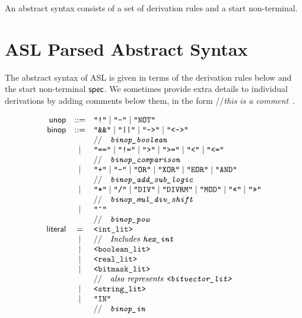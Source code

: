 \documentclass{book}
\begin{document}
\newpage

An abstract syntax consists of a set of derivation rules and a start non-terminal.

\newcommand\ASTComment[1]{//\quad\textit{#1}\ }

\section{ASL Parsed Abstract Syntax}

The abstract syntax of ASL is given in terms of the derivation rules below and the start non-terminal $\textsf{spec}$.
%
We sometimes provide extra details to individual derivations by adding comments below them, in the form \ASTComment{this is a comment}.

\[
\begin{array}{rcl}
\unop &::=& \texttt{"!"} \;|\; \texttt{"-"} \;|\; \texttt{"NOT"} \\
\binop &::=& \texttt{"\&\&"} \;|\; \texttt{"||"} \;|\; \texttt{"-->"} \;|\;  \texttt{"<->"}  \\
 & & \ASTComment{\texttt{binop\_boolean}}\\

 &|& \texttt{"=="} \;|\; \texttt{"!="}  \;|\; \texttt{">"}  \;|\; \texttt{">="} \;|\; \texttt{"<"} \;|\; \texttt{"<="}   \\
 & & \ASTComment{\texttt{binop\_comparison}}\\

 &|& \texttt{"+"} \;|\; \texttt{"-"}  \;|\; \texttt{"OR"}  \;|\; \texttt{"XOR"} \;|\; \texttt{"EOR"} \;|\; \texttt{"AND"}   \\
 & & \ASTComment{\texttt{binop\_add\_sub\_logic}}\\

 &|& \texttt{"*"} \;|\; \texttt{"/"}  \;|\; \texttt{"DIV"}  \;|\; \texttt{"DIVRM"} \;|\; \texttt{"MOD"}  \;|\; \texttt{"<<"}  \;|\; \texttt{">>"}    \\
 & & \ASTComment{\texttt{binop\_mul\_div\_shift}}\\

 &|& \texttt{"\^{}"}   \\
 & & \ASTComment{\texttt{binop\_pow}}\\

\literal &=& \texttt{<int\_lit>}  \\
 &|&\ASTComment{Includes \texttt{hex\_int}} \\
 &|&\texttt{<boolean\_lit>}  \\
 &|& \texttt{<real\_lit>}  \\
 &|& \texttt{<bitmask\_lit>}   \\
 & & \ASTComment{also represents \texttt{<bitvector\_lit>}}\\
 &|&\texttt{<string\_lit>} \\
 &|& \texttt{"IN"}   \\
 & & \ASTComment{\texttt{binop\_in}}\\


\end{array}\]
\end{document}
